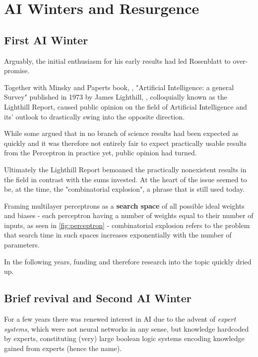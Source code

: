 \chapter{AI Winters and Resurgence}

\section{First AI Winter}

Arguably, the initial enthusiasm for his early results had led Rosenblatt to over-promise. 

Together with Minsky and Paperts book, \cite{minsky}, "Artificial Intelligence: a general Survey" published in 1973 by James Lighthill, \cite{lighthill1973artificial}, colloquially known as the Lighthill Report, caused public opinion on the field of Artificial Intelligence and its' outlook to drastically swing into the opposite direction.

While some argued that in no branch of science results had been expected as quickly and it was therefore not entirely fair to expect practically usable results from the Perceptron in practice yet, public opinion had turned.

Ultimately the Lighthill Report bemoaned the practically nonexistent results in the field in contrast with the sums invested. At the heart of the issue seemed to be, at the time, the "combinatorial explosion", a phrase that is still used today.

Framing multilayer perceptrons as a \textbf{search space} of all possible ideal weights and biases - each perceptron having a number of weights equal to their number of inputs, as seen in \ref{fig:perceptron} - combinatorial explosion refers to the problem that search time in such spaces increases exponentially with the number of parameters. 

In the following years, funding and therefore research into the topic quickly dried up.

\section{Brief revival and Second AI Winter}

For a few years there was renewed interest in \ac{AI} due to the advent of \textit{expert systems}, which were not neural networks in any sense, but knowledge hardcoded by experts, constituting (very) large boolean logic systems encoding knowledge gained from experts (hence the name). 


